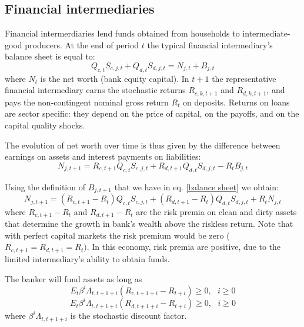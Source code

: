 \documentclass{article}
\begin{document}
\bigskip

\subsection{Financial intermediaries}

Financial intermerdiaries lend funds obtained from households to
intermediate-good producers. At the end of period $t$ the typical financial
intermediary's balance sheet is equal to:%
\begin{equation}
Q_{c,t}S_{c,j,t}+Q_{d,t}S_{d,j,t}=N_{j,t}+B_{j,t}  \label{balance sheet}
\end{equation}%
where $N_{t}$ is the net worth (bank equity capital). In $t+1$ the
representative financial intermediary earns the stochastic returns $%
R_{c,k,t+1}$ and $R_{d,k,t+1}$, and pays the non-contingent nominal gross
return $R_{t}$ on deposits. Returns on loans are sector specific: they
depend on the price of capital, on the payoffs, and on the capital quality
shocks.

The evolution of net worth over time is thus given by the difference between
earnings on assets and interest payments on liabilities:%
\begin{equation}
N_{j,t+1}=R_{c,t+1}Q_{c,t}S_{c,j,t}+R_{d,t+1}Q_{d,t}S_{d,j,t}-R_{t}B_{j,t}
\label{net_worth_over_time}
\end{equation}

Using the definition of $B_{j,t+1}$ that we have in eq. \ref{balance sheet}
we obtain:%
\begin{equation*}
N_{j,t+1}=(R_{c,t+1}-R_{t})Q_{c,t}S_{c,j,t}+(R_{d,t+1}-R_{t})Q_{d,t}S_{d,j,t}+R_{t}N_{j,t}
\end{equation*}%
where $R_{c,t+1}-R_{t}$ and $R_{d,t+1}-R_{t}$ are the risk premia on clean
and dirty assets that determine the growth in bank's wealth above the
riskless return. Note that with perfect capital markets the risk premium
would be zero ($R_{c,t+1}=R_{d,t+1}=R_{t})$. In this economy, risk premia
are positive, due to the limited intermediary's ability to obtain funds.

The banker will fund assets as long as%
\begin{equation*}
E_{t}\beta ^{i}\Lambda _{t,t+1+i}(R_{c,t+1+i}-R_{t+i})\geq 0,\text{ }i\geq 0
\end{equation*}%
\begin{equation*}
E_{t}\beta ^{i}\Lambda _{t,t+1+i}(R_{d,t+1+i}-R_{t+i})\geq 0,\text{ }i\geq 0
\end{equation*}%
where $\beta ^{i}\Lambda _{t,t+1+i}$ is the stochastic discount factor.
\end{document}
